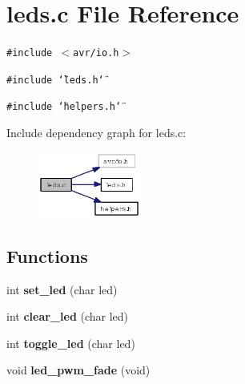 \section{leds.c File Reference}
\label{leds_8c}
{\tt \#include $<$avr/io.h$>$}\par
{\tt \#include \char`\"{}leds.h\char`\"{}}\par
{\tt \#include \char`\"{}helpers.h\char`\"{}}\par


Include dependency graph for leds.c:\begin{figure}[H]
\begin{center}
\leavevmode
\includegraphics[width=95pt]{leds_8c__incl}
\end{center}
\end{figure}
\subsection*{Functions}
\begin{CompactItemize}
\item 
int {\bf set\_\-led} (char led)
\item 
int {\bf clear\_\-led} (char led)
\item 
int {\bf toggle\_\-led} (char led)
\item 
void {\bf led\_\-pwm\_\-fade} (void)
\end{CompactItemize}
